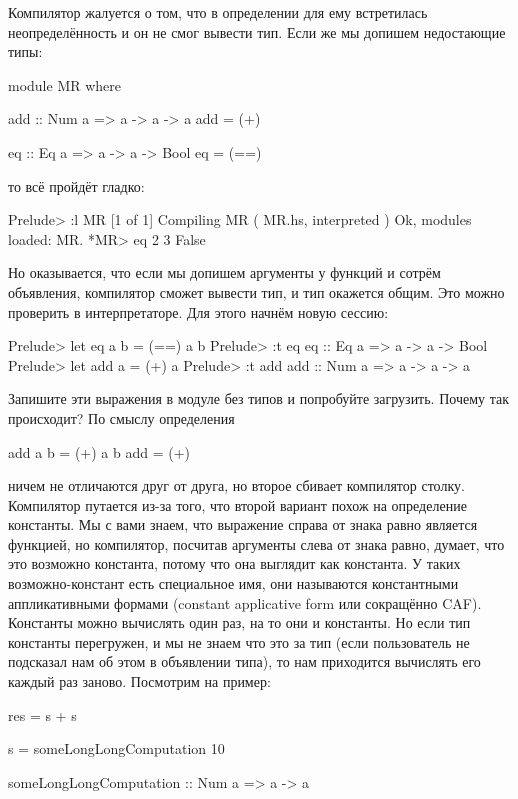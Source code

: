 Компилятор жалуется о том, что в определении для 
ему встретилась неопределённость и он не смог вывести тип. 
Если же мы допишем недостающие типы:

\begin{code}
module MR where

add :: Num a => a -> a -> a
add = (+)

eq :: Eq a => a -> a -> Bool
eq  = (==)
\end{code}

то всё пройдёт гладко:

\begin{code}
Prelude> :l MR
[1 of 1] Compiling MR               ( MR.hs, interpreted )
Ok, modules loaded: MR.
*MR> eq 2 3
False
\end{code}

Но оказывается, что если мы допишем аргументы у функций
и сотрём объявления, компилятор сможет вывести тип, и
тип окажется общим. Это можно проверить в интерпретаторе.
Для этого начнём новую сессию:

\begin{code}
Prelude> let eq a b = (==) a b 
Prelude> :t eq
eq :: Eq a => a -> a -> Bool
Prelude> let add a = (+) a
Prelude> :t add
add :: Num a => a -> a -> a
\end{code}

Запишите эти выражения в модуле без типов и попробуйте
загрузить. Почему так происходит? По смыслу определения

\begin{code}
add a b = (+) a b
add     = (+)
\end{code}

\noindent ничем не отличаются друг от друга, но второе
сбивает компилятор столку. Компилятор путается из-за
того, что второй вариант похож на определение константы.
Мы с вами знаем, что выражение справа от знака равно является
функцией, но компилятор, посчитав аргументы слева от знака
равно, думает, что это возможно константа, потому что она
выглядит как константа. У таких возможно-констант
есть специальное имя, они называются константными аппликативными
формами (constant applicative form или сокращённо CAF). 
Константы можно вычислять один раз, на то они и константы. 
Но если тип константы перегружен, и мы не знаем что 
это за тип (если пользователь не подсказал нам об этом в 
объявлении типа), то нам приходится вычислять его 
каждый раз заново. Посмотрим на пример:

\begin{code}
res = s + s

s = someLongLongComputation 10

someLongLongComputation :: Num a => a -> a
\end{code}

